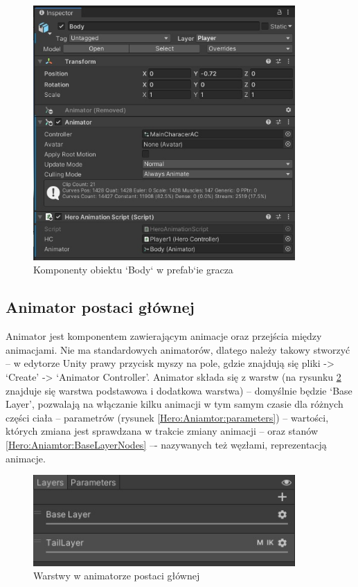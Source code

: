 \documentclass[12pt,twoside]{article}
\begin{document}
\begin{figure}[!ht]
    \centering
	\includegraphics[width=10cm]{RealizacjaProjektu/UnityPictires/Player1_Body_components.jpg}
	\caption{Komponenty obiektu `Body` w prefab`ie gracza} 
    \label{Hero:BodyComponents}
\end{figure}
\clearpage
\subsection{Animator postaci głównej}
Animator jest komponentem zawierającym animacje oraz przejścia między
animacjami. Nie ma standardowych animatorów, dlatego należy takowy stworzyć -- w
edytorze Unity prawy przycisk myszy na pole, gdzie znajdują się pliki ->
`Create' -> `Animator Controller'. Animator składa się z warstw (na rysunku
\ref{Hero:Aniamtor:Layers} znajduje się warstwa podstawowa i dodatkowa warstwa)
– domyślnie będzie `Base Layer', pozwalają na włączanie kilku animacji w tym
samym czasie dla różnych części ciała -- parametrów (rysunek
\ref{Hero:Aniamtor:parameters}) -- wartości, których zmiana jest sprawdzana w
trakcie zmiany animacji -- oraz stanów \ref{Hero:Aniamtor:BaseLayerNodes} –-
nazywanych też węzłami, reprezentacją animacje. 

\begin{figure}[!ht]
    \centering
	\includegraphics[width=10cm]{RealizacjaProjektu/UnityPictires/Animator/Player1_Layers.jpg}
	\caption{Warstwy w animatorze postaci głównej}
    \label{Hero:Aniamtor:Layers}
\end{figure}
\end{document}
